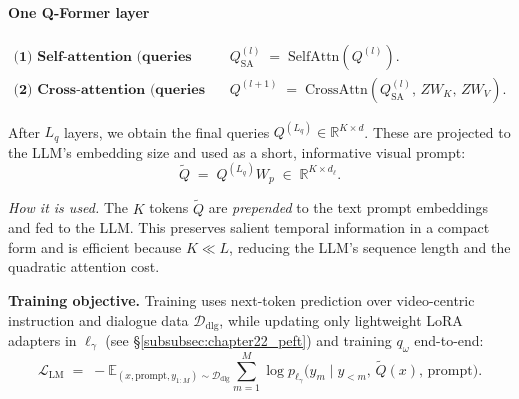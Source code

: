 \begin{enrichment}
\begin{enrichment}
        \paragraph{One Q-Former layer}
        \begin{align}
            \textbf{(1) Self-attention (queries talk to each other):}\quad
            & Q_{\text{SA}}^{(l)} \;=\; \mathrm{SelfAttn}\!\left(Q^{(l)}\right). \label{eq:qformer-sa} \\
            \textbf{(2) Cross-attention (queries read from video):}\quad
            & Q^{(l+1)} \;=\; \mathrm{CrossAttn}\!\left(Q_{\text{SA}}^{(l)},\, ZW_K,\, ZW_V\right). \label{eq:qformer-ca}
        \end{align}
        
        \noindent
        After $L_q$ layers, we obtain the final queries $Q^{(L_q)} \in \mathbb{R}^{K \times d}$. These are projected to the LLM’s embedding size and used as a short, informative visual prompt:
        \begin{equation}
            \widetilde{Q} \;=\; Q^{(L_q)} W_p \;\in\; \mathbb{R}^{K \times d_\ell}.
        \end{equation}
        
        \noindent
        \emph{How it is used.} The $K$ tokens $\widetilde{Q}$ are \emph{prepended} to the text prompt embeddings and fed to the LLM. This preserves salient temporal information in a compact form and is efficient because $K \ll L$, reducing the LLM’s sequence length and the quadratic attention cost.
        
        \medskip
        \noindent
        \textbf{Training objective.} Training uses next-token prediction over video-centric instruction and dialogue data $\mathcal{D}_{\text{dlg}}$, while updating only lightweight LoRA adapters in $\ell_\gamma$ (see \S\ref{subsubsec:chapter22_peft}) and training $q_\omega$ end-to-end:
        \begin{equation}
            \mathcal{L}_{\text{LM}} \;=\; - \mathbb{E}_{(x,\text{prompt}, y_{1:M}) \sim \mathcal{D}_{\text{dlg}}} \sum_{m=1}^{M} \log p_{\ell_\gamma}\!\big( y_m \mid y_{<m},\, \widetilde{Q}(x),\, \text{prompt} \big).
            \label{eq:chapter24_iv2_lm}
        \end{equation}
        

\end{enrichment}
\end{enrichment}
